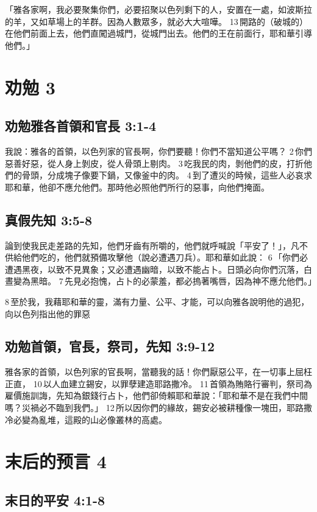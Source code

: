 「雅各家啊，我必要聚集你們，必要招聚以色列剩下的人，安置在一處，如波斯拉的羊，又如草場上的羊群。因為人數眾多，就必大大喧嘩。 13 開路的（破城的）在他們前面上去，他們直闖過城門，從城門出去。他們的王在前面行，耶和華引導他們。」



\section{劝勉 3}
\subsection{劝勉雅各首領和官長 3:1-4}
我說：雅各的首領，以色列家的官長啊，你們要聽！你們不當知道公平嗎？ 2 你們惡善好惡，從人身上剝皮，從人骨頭上剔肉。 3 吃我民的肉，剝他們的皮，打折他們的骨頭，分成塊子像要下鍋，又像釜中的肉。 4 到了遭災的時候，這些人必哀求耶和華，他卻不應允他們。那時他必照他們所行的惡事，向他們掩面。

\subsection{真假先知 3:5-8}
論到使我民走差路的先知，他們牙齒有所嚼的，他們就呼喊說「平安了！」，凡不供給他們吃的，他們就預備攻擊他（說必遭遇刀兵）。耶和華如此說： 6 「你們必遭遇黑夜，以致不見異象；又必遭遇幽暗，以致不能占卜。日頭必向你們沉落，白晝變為黑暗。 7 先見必抱愧，占卜的必蒙羞，都必摀著嘴唇，因為神不應允他們。」 

8 至於我，我藉耶和華的靈，滿有力量、公平、才能，可以向雅各說明他的過犯，向以色列指出他的罪惡

\subsection{劝勉首領，官長，祭司，先知 3:9-12}
雅各家的首領，以色列家的官長啊，當聽我的話！你們厭惡公平，在一切事上屈枉正直， 10 以人血建立錫安，以罪孽建造耶路撒冷。 11 首領為賄賂行審判，祭司為雇價施訓誨，先知為銀錢行占卜，他們卻倚賴耶和華說：「耶和華不是在我們中間嗎？災禍必不臨到我們。」 12 所以因你們的緣故，錫安必被耕種像一塊田，耶路撒冷必變為亂堆，這殿的山必像叢林的高處。



\section{末后的预言 4}
\subsection{末日的平安 4:1-8}
